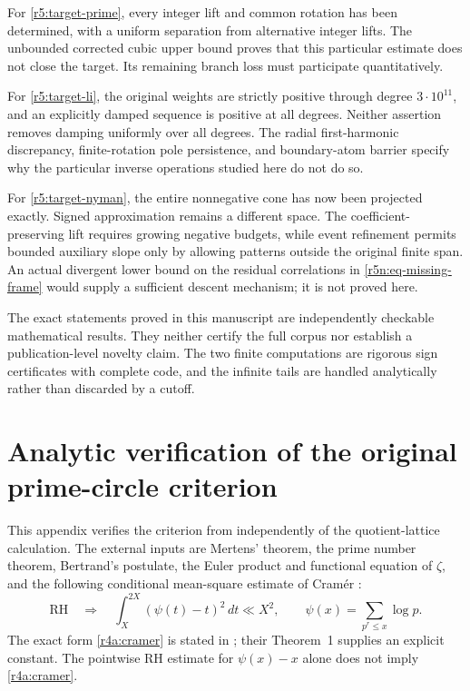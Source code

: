 \documentclass[11pt,a4paper]{article}
\theoremstyle{definition}\newtheorem{definition}[theorem]{Definition}
\theoremstyle{remark}\newtheorem{remark}[theorem]{Remark}
\numberwithin{equation}{section}
\begin{document}
For \eqref{r5:target-prime}, every integer lift and common rotation
has been determined, with a uniform separation from alternative
integer lifts. The unbounded corrected cubic upper bound proves
that this particular estimate does not close the target. Its
remaining branch loss must participate quantitatively.

For \eqref{r5:target-li}, the original weights are strictly positive
through degree $3\cdot10^{11}$, and an explicitly damped sequence
is positive at all degrees. Neither assertion removes damping
uniformly over all degrees. The radial first-harmonic discrepancy,
finite-rotation pole persistence, and boundary-atom barrier specify
why the particular inverse operations studied here do not do so.

For \eqref{r5:target-nyman}, the entire nonnegative cone has now
been projected exactly. Signed approximation remains a different
space. The coefficient-preserving lift requires growing negative
budgets, while event refinement permits bounded auxiliary slope
only by allowing patterns outside the original finite span.
An actual divergent lower bound on the residual correlations in
\eqref{r5n:eq-missing-frame} would supply a sufficient descent
mechanism; it is not proved here.

The exact statements proved in this manuscript are independently
checkable mathematical results. They neither certify the full
corpus nor establish a publication-level novelty claim. The two
finite computations are rigorous sign certificates with complete
code, and the infinite tails are handled analytically rather than
discarded by a cutoff.


\appendix
\clearpage

\section{Analytic verification of the original prime-circle criterion}
\label{r4a:appendix}

This appendix verifies the criterion from \cite{PrimeCircles}
independently of the quotient-lattice calculation.  The external
inputs are Mertens' theorem, the prime number theorem, Bertrand's
postulate, the Euler product and functional equation of $\zeta$, and
the following conditional mean-square estimate of Cram\'er
\cite{Cramer}:
\begin{equation}\label{r4a:cramer}
 \mathrm{RH}\quad\Longrightarrow\quad
 \int_X^{2X}(\psi(t)-t)^2\,dt\ll X^2,
 \qquad
 \psi(x)=\sum_{p^r\leq x}\log p.
\end{equation}
The exact form \eqref{r4a:cramer} is stated in
\cite[eq.~(1)]{BrentPlattTrudgian}; their Theorem~1 supplies an
explicit constant.  The pointwise RH estimate for $\psi(x)-x$
alone does not imply \eqref{r4a:cramer}.
\end{document}
